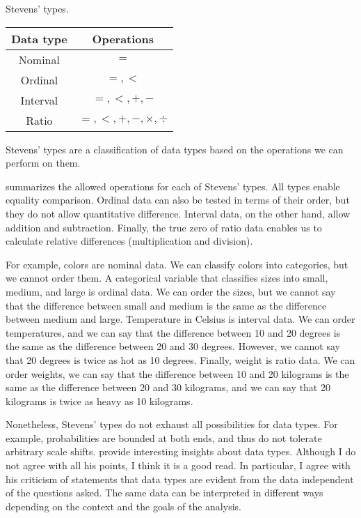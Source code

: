 \begin{tablebox}[label=tab:stevens]{Stevens' types.}
  \centering
  \begin{tabular}{cc}
    \toprule
    \textbf{Data type} & \textbf{Operations} \\
    \midrule
    Nominal & $=$ \\
    Ordinal & $=, <$ \\
    Interval & $=, <, +, - $ \\
    Ratio & $=, <, +, -, \times, \div$ \\
    \bottomrule
  \end{tabular}
  \tcblower
  Stevens' types are a classification of data types based on the operations we can perform
  on them.
\end{tablebox}

 summarizes the allowed operations for each of Stevens' types.  All types
enable equality comparison.  Ordinal data can also be tested in terms of their order, but
they do not allow quantitative difference.  Interval data, on the other hand, allow
addition and subtraction.  Finally, the true zero of ratio data enables us to calculate
relative differences (multiplication and division).

For example, colors are nominal data.  We can classify colors into categories, but we cannot
order them.  A categorical variable that classifies sizes into small, medium, and large is
ordinal data.  We can order the sizes, but we cannot say that the difference between small
and medium is the same as the difference between medium and large.  Temperature in Celsius
is interval data.  We can order temperatures, and we can say that the difference between
10 and 20 degrees is the same as the difference between 20 and 30 degrees.  However, we
cannot say that 20 degrees is twice as hot as 10 degrees.  Finally, weight is ratio data.
We can order weights, we can say that the difference between 10 and 20 kilograms is the
same as the difference between 20 and 30 kilograms, and we can say that 20 kilograms is
twice as heavy as 10 kilograms.

Nonetheless, Stevens' types do not exhaust all possibilities for data types.  For example,
probabilities are bounded at both ends, and thus do not tolerate arbitrary scale shifts.
\textcite{Paul1993} provide interesting insights about data types.  Although I do not
agree with all his points, I think it is a good read.  In particular, I agree with
his criticism of statements that data types are evident from the data independent of the
questions asked.  The same data can be interpreted in different ways depending on the
context and the goals of the analysis.

